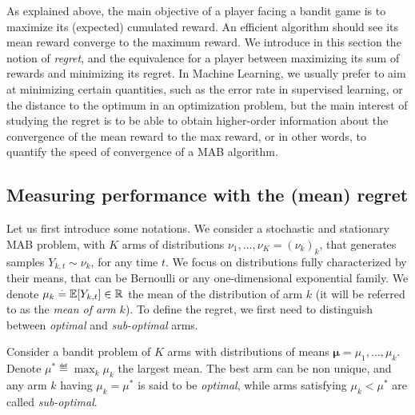 As explained above, the main objective of a player facing a bandit game is to maximize its (expected) cumulated reward.
An efficient algorithm should see its mean reward converge to the maximum reward.
We introduce in this section the notion of \emph{regret}, and the equivalence for a player between maximizing its sum of rewards and minimizing its regret.
In Machine Learning, we usually prefer to aim at minimizing certain quantities, such as the error rate in supervised learning, or the distance to the optimum in an optimization problem,
but the main interest of studying the regret is to be able to obtain higher-order information about the convergence of the mean reward to the max reward,
or in other words, to quantify the speed of convergence of a MAB algorithm.


\subsection{Measuring performance with the (mean) regret}

Let us first introduce some notations.
We consider a stochastic and stationary MAB problem, with $K$ arms of distributions $\nu_1,\dots,\nu_K=(\nu_k)_k$, that generates \iid{} samples $Y_{k,t} \sim \nu_k$, for any time $t$.
We focus on distributions fully characterized by their means, that can be Bernoulli or any one-dimensional exponential family.
We denote $\mu_k \overset{.}{=} \mathbb{E}[Y_{k,t}] \in \mathbb{R}$ the mean of the distribution of arm $k$ (it will be referred to as the \emph{mean of arm $k$}).
%
%
To define the regret, we first need to distinguish between \emph{optimal} and \emph{sub-optimal} arms.

\begin{definition}\label{def:2:optimalSubOptimalArms}
\begin{leftbar}[defnbar]  %
    Consider a bandit problem of $K$ arms with distributions of means $\bm{\mu}=\mu_1,\dots,\mu_k$.
    Denote $\mu^* \eqdef \max_k \mu_k$ the largest mean.
    The best arm can be non unique, and any arm $k$ having $\mu_k = \mu^*$ is said to be \emph{optimal},
    while arms satisfying $\mu_k < \mu^*$ are called \emph{sub-optimal}.
\end{leftbar}  %
\end{definition}

